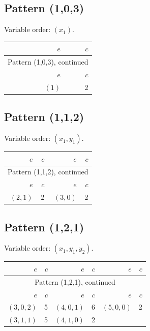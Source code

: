\subsection{Pattern (1,0,3)}
Variable order: $(x_{1})$.
\begingroup\small
\setlength{\tabcolsep}{8pt}
\begin{longtable}{@{}rr@{}}
\toprule
$e$&$c$\\\midrule
\endfirsthead
\multicolumn{2}{c}{Pattern (1,0,3), continued}\\
\toprule
$e$&$c$\\\midrule
\endhead
$(1)$&2\\
\bottomrule
\end{longtable}
\endgroup
\subsection{Pattern (1,1,2)}
Variable order: $(x_{1}, y_{1})$.
\begingroup\small
\setlength{\tabcolsep}{8pt}
\begin{longtable}{@{}rr@{\qquad}rr@{}}
\toprule
$e$&$c$&$e$&$c$\\\midrule
\endfirsthead
\multicolumn{4}{c}{Pattern (1,1,2), continued}\\
\toprule
$e$&$c$&$e$&$c$\\\midrule
\endhead
$(2,1)$&2&$(3,0)$&2\\
\bottomrule
\end{longtable}
\endgroup
\subsection{Pattern (1,2,1)}
Variable order: $(x_{1}, y_{1}, y_{2})$.
\begingroup\small
\setlength{\tabcolsep}{8pt}
\begin{longtable}{@{}rr@{\qquad}rr@{\qquad}rr@{}}
\toprule
$e$&$c$&$e$&$c$&$e$&$c$\\\midrule
\endfirsthead
\multicolumn{6}{c}{Pattern (1,2,1), continued}\\
\toprule
$e$&$c$&$e$&$c$&$e$&$c$\\\midrule
\endhead
$(3,0,2)$&5&$(4,0,1)$&6&$(5,0,0)$&2\\
$(3,1,1)$&5&$(4,1,0)$&2&&\\
\bottomrule
\end{longtable}
\endgroup
